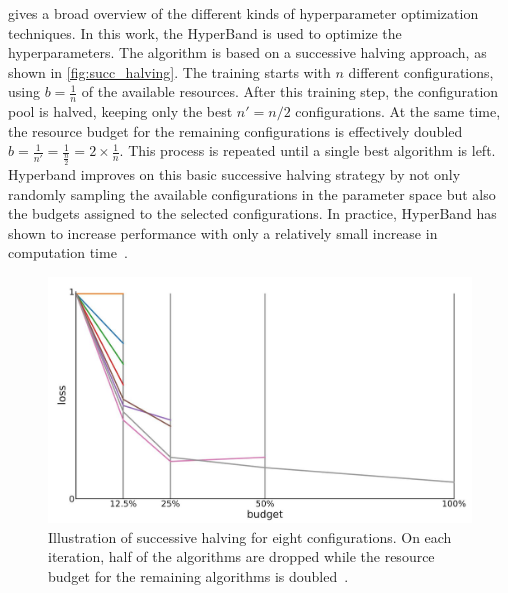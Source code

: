 \documentclass[10pt,final,journal,a4paper,oneside,twocolumn]{IEEEtran}
\begin{document}
\cite{Feurer.2019} gives a broad overview of the different kinds of hyperparameter optimization techniques. In this work, the HyperBand \cite{li2017hyperband} is used to optimize the hyperparameters. The algorithm is based on a successive halving approach, as shown in \autoref{fig:succ_halving}.
The training starts with $n$ different configurations, using $b=\frac{1}{n}$ of the available resources. After this training step, the configuration pool is halved, keeping only the best $n' = n/2$ configurations. At the same time, the resource budget for the remaining configurations is effectively doubled $b=\frac{1}{n'}=\frac{1}{\frac{n}{2}} = 2\times\frac{1}{n}$.
This process is repeated until a single best algorithm is left. Hyperband improves on this basic successive halving strategy by not only randomly sampling the available configurations in the parameter space but also the budgets assigned to the selected configurations. In practice, HyperBand has shown to increase performance with only a relatively small increase in computation time~\cite[p. 17]{Feurer.2019}.


\begin{figure}[ht]
    \centering
    \includegraphics[width=\linewidth]{successive_halving}
    \caption{Illustration of successive halving for eight configurations. On each iteration, half of the algorithms are dropped while the resource budget for the remaining algorithms is doubled~\cite{Feurer.2019}.}
    \label{fig:succ_halving}
\end{figure}

\end{document}

